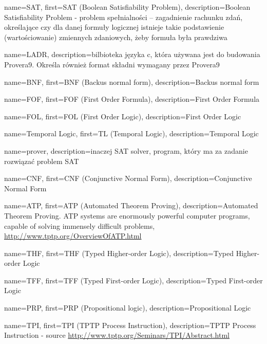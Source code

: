 
 {
    name=SAT,
    first={SAT (Boolean Satisfiability Problem)},
    description={Boolean Satisfiability Problem - problem spełnialności – zagadnienie rachunku zdań, określające czy dla danej formuły logicznej istnieje takie podstawienie (wartościowanie) zmiennych zdaniowych, żeby formuła była prawdziwa}
}

 {
    name=LADR,
    description={bilbioteka języka c, która używana jest do budowania Provera9. Określa również format składni wymagany przez Provera9}
}

 {
    name=BNF,
    first={BNF (Backus normal form)},
    description={Backus normal form}
}

 {
    name=FOF,
    first={FOF (First Order Formula)},
    description={First Order Formula}
}

 {
    name=FOL,
    first={FOL (First Order Logic)},
    description={First Order Logic}
}

 {
    name={Temporal Logic},
    first={TL (Temporal Logic)},
    description={Temporal Logic}
}

 {
    name=prover,
    description={inaczej SAT solver, program, który ma za zadanie rozwiązać problem SAT}
}

 {
    name=CNF,
    first={CNF (Conjunctive Normal Form)},
    description={Conjunctive Normal Form}
}

 {
    name=ATP,
    first={ATP (Automated Theorem Proving)},
    description={Automated Theorem Proving. ATP systems are enormously powerful computer programs, capable of solving immensely difficult problems, \url{http://www.tptp.org/OverviewOfATP.html}}
}

 {
    name=THF,
    first={THF (Typed Higher-order Logic)},
    description={Typed Higher-order Logic}
}

 {
    name=TFF,
    first={TFF (Typed First-order Logic)},
    description={Typed First-order Logic}
}

 {
    name={PRP},
    first={PRP (Propositional logic)},
    description={Propositional Logic}
}

 {
    name=TPI,
    first={TPI (TPTP Process Instruction)},
    description={TPTP Process Instruction - source \url{http://www.tptp.org/Seminars/TPI/Abstract.html}}
}

